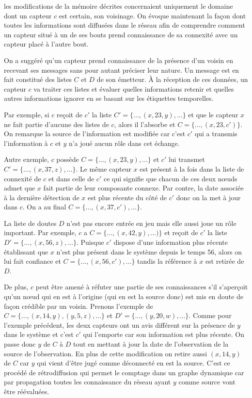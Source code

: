 \documentclass[10pt]{article}
\begin{document}
\begin{multicols}{2}
les modifications de la mémoire décrites concernaient uniquement le
domaine dont un capteur $c$ est certain, son voisinage. On évoque
maintenant la façon dont toutes les informations sont diffusées dans
le réseau afin de comprendre comment un capteur situé à un de ses
bouts prend connaissance de sa connexité avec un capteur placé à
l'autre bout.

On a suggéré qu'un capteur prend connaissance de la présence d'un
voisin en recevant ses messages sans pour autant préciser leur
nature. Un message est en fait constitué des listes $C$ et $D$ de son
émetteur. \`A la réception de ces données, un capteur $c$ va traiter
ces listes et évaluer quelles informations retenir et quelles autres
informations ignorer en se basant sur les étiquettes temporelles.

Par exemple, si $c$ reçoit de $c'$ la liste $C' =
\{\dots,(x,23,y),\dots\}$ et que le capteur $x$ ne fait partie
d'aucune des listes de $c$, alors il l'absorbe et $C =
\{\dots,(x,23,c')\}$. On remarque la source de l'information est
modifiée car c'est $c'$ qui a transmis l'information à $c$ et $y$ n'a
joué aucun rôle dans cet échange.

Autre exemple, $c$ possède $C = \{\dots,(x,23,y),\dots\}$ et $c'$ lui
transmet $C' = \{\dots,(x,37,z),\dots\}$. Le même capteur $x$ est
présent à la fois dans la liste de connexité de $c$ et dans celle de
$c'$ ce qui signifie que chacun de ces deux n\oe uds admet que $x$
fait partie de leur composante connexe. Par contre, la date associée à
la dernière détection de $x$ est plus récente du côté de $c'$ donc on
la met à jour dans $c$. On a au final $C = \{\dots,(x,37,c'),\dots\}$.

La liste de doutes $D$ n'est pas encore entrée en jeu mais elle aussi
joue un rôle important. Par exemple, $c$ a $C =
\{\dots,(x,42,y),\dots)\}$ et reçoit de $c'$ la liste $D' =
\{\dots,(x,56,z),\dots\}$. Puisque $c'$ dispose d'une information plus
récente établissant que $x$ n'est plus présent dans le système depuis
le temps 56, alors on lui fait confiance et $C =
\{\dots,(x,56,c'),\dots\}$ tandis la référence à $x$ est retirée de
$D$.

De plus, $c$ peut être amené à réfuter une partie de ses connaissances
s'il s'aperçoit qu'un n\oe ud qui en est à l'origine (qui en est la
source donc) est mis en doute de façon crédible par un voisin. Prenons
l'exemple de $C = \{\dots,(x,14,y),(y,5,z),\dots\}$ et $D' =
\{\dots,(y,20,w),\dots\}$. Comme pour l'exemple précédent, les deux
capteurs ont un avis différent sur la présence de $y$ dans le système
et c'est $c'$ qui l'emporte car son information est plus récente. On
passe donc $y$ de $C$ à $D$ tout en mettant à jour la date de
l'observation de la source de l'observation. En plus de cette
modification on retire aussi $(x,14,y)$ de $C$ car $y$ qui vient
d'être jugé comme déconnecté en est la source. C'est ce procédé de
rétrodiffusion qui permet le comptage dans un graphe dynamique car par
propagation toutes les connaissance du réseau ayant $y$ comme source
vont être réévaluées.


\end{multicols}
\end{document}

